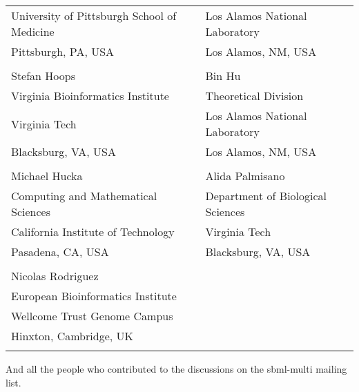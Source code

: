 \begin{center}
\begin{tabular}{l @{\hspace{20 pt}} l}
  University of Pittsburgh School of Medicine	& Los Alamos National Laboratory \\
  Pittsburgh, PA, USA			&  Los Alamos, NM, USA\\
  \\
  Stefan Hoops 				& Bin Hu \\[0.25em]
  Virginia Bioinformatics Institute 	& Theoretical Division \\
  Virginia Tech 			& Los Alamos National Laboratory \\
  Blacksburg, VA, USA 			& Los Alamos, NM, USA \\
  \\
  Michael Hucka 			& Alida Palmisano\\[0.25em]
  Computing and Mathematical Sciences	& Department of Biological Sciences\\
  California Institute of Technology	& Virginia Tech \\
  Pasadena, CA, USA			& Blacksburg, VA, USA \\
  \\
  Nicolas Rodriguez 			& \\[0.25em]
  European Bioinformatics Institute	& \\
  Wellcome Trust Genome Campus		& \\
  Hinxton, Cambridge, UK		& \\
  \\
  \end{tabular}
\end{center}
  
And all the people who contributed to the discussions on the sbml-multi mailing list.
